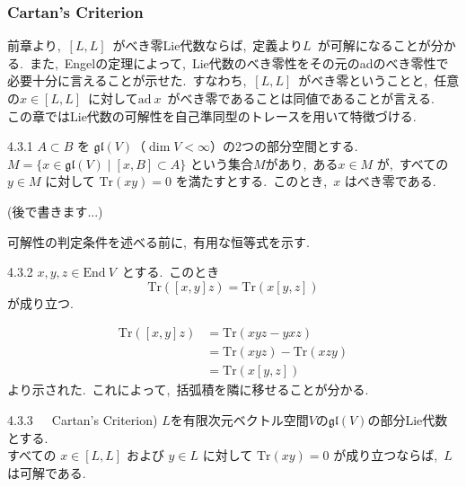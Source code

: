 \documentclass[uplatex,dvipdfmx]{jsarticle}
\begin{document}
\subsubsection{Cartan's Criterion}
前章より,~$[L,L]$~がべき零Lie代数ならば,~定義より$L$~が可解になることが分かる.~また,~Engelの定理によって,~Lie代数のべき零性をその元のadのべき零性で必要十分に言えることが示せた.~すなわち,~$[L,L]$~がべき零ということと,~任意の$x\in [L,L]$~に対して$\text{ad}~x$~がべき零であることは同値であることが言える.\\
この章ではLie代数の可解性を自己準同型のトレースを用いて特徴づける.
\begin{mylemma}{4.3.1}
    $A \subset B$ を $\mathfrak{gl}(V)$（$\dim V < \infty$）の2つの部分空間とする.\\
    $M = \{x \in \mathfrak{gl}(V) \mid [x, B] \subset A\}$ という集合$M$があり,~ある$x \in M$ が,~すべての $y \in M$ に対して $\text{Tr}(xy) = 0$ を満たすとする.~このとき,~$x$ はべき零である.
\end{mylemma}
\begin{myproof}
    (後で書きます...)
\end{myproof}
可解性の判定条件を述べる前に,~有用な恒等式を示す.
\begin{mylemma}{4.3.2}
    $x,y,z \in \text{End}~V$~とする.~このとき
    \begin{equation*}
        \text{Tr}([x, y]z) = \text{Tr}(x[y, z])
    \end{equation*}
    が成り立つ.
\end{mylemma}
\begin{myproof}
    \begin{equation*}
    \begin{split}
        \text{Tr}([x, y]z)&=\text{Tr}(xyz-yxz)\\
        &=\text{Tr}(xyz)-\text{Tr}(xzy)\\
        &=\text{Tr}(x[y,z])
    \end{split}
    \end{equation*}
    より示された.~これによって,~括弧積を隣に移せることが分かる.
\end{myproof}
\begin{mythm}{4.3.3~~~Cartan's Criterion)}
    $L$を有限次元ベクトル空間$V$の$\mathfrak{gl}(V)$の部分Lie代数とする.\\
    すべての $x \in [L, L]$ および $y \in L$ に対して $\text{Tr}(xy) = 0$ が成り立つならば,~$L$ は可解である.
\end{mythm}
\end{document}

